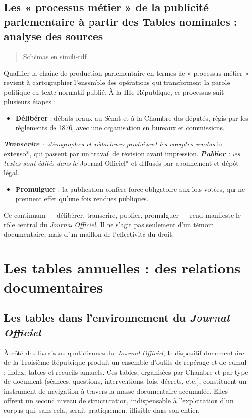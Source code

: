 \section{Les « processus métier » de la publicité parlementaire à partir des Tables nominales : analyse des sources}

\begin{quote}
Schémas en simili-rdf 

\end{quote}
Qualifier la chaîne de production parlementaire en termes de « processus métier » revient à cartographier l’ensemble des opérations qui transforment la parole politique en texte normatif publié. À la IIIe République, ce processus suit plusieurs étapes :

\begin{itemize}
\item \textbf{Délibérer} : débats oraux au Sénat et à la Chambre des députés, régis par les règlements de 1876, avec une organisation en bureaux et commissions.
\end{itemize}
\emph{ \textbf{Transcrire} : sténographes et rédacteurs produisent les comptes rendus }in extenso*, qui passent par un travail de révision avant impression.
\emph{ \textbf{Publier} : les textes sont édités dans le }Journal Officiel* et diffusés par abonnement et dépôt légal.
\begin{itemize}
\item \textbf{Promulguer} : la publication confère force obligatoire aux lois votées, qui ne prennent effet qu’une fois rendues publiques.

\end{itemize}
Ce continuum — délibérer, transcrire, publier, promulguer — rend manifeste le rôle central du \emph{Journal Officiel}. Il ne s’agit pas seulement d’un témoin documentaire, mais d’un maillon de l’effectivité du droit.

\chapter{Les tables annuelles : des relations documentaires}

\section{Les tables dans l’environnement du \emph{Journal Officiel}}

À côté des livraisons quotidiennes du \emph{Journal Officiel}, le dispositif documentaire de la Troisième République produit un ensemble d’outils de repérage et de cumul : index, tables et recueils annuels. Ces tables, organisées par Chambre et par type de document (séances, questions, interventions, lois, décrets, etc.), constituent un instrument de navigation à travers la masse documentaire accumulée. Elles offrent un second niveau de structuration, indispensable à l’exploitation d’un corpus qui, sans cela, serait pratiquement illisible dans son entier.

